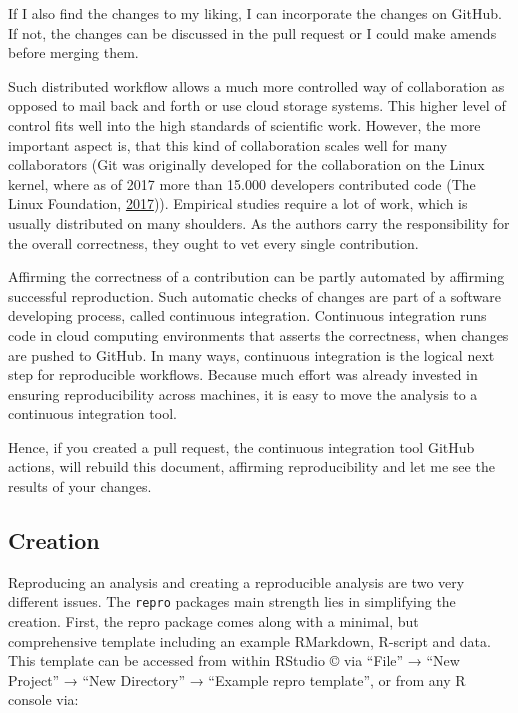 \documentclass[12pt,a4paper,]{article}
\begin{document}
If I also find the changes to my liking, I can incorporate the changes on GitHub.
If not, the changes can be discussed in the pull request or I could make amends before merging them.

Such distributed workflow allows a much more controlled way of collaboration as opposed to mail back and forth or use cloud storage systems.
This higher level of control fits well into the high standards of scientific work.
However, the more important aspect is, that this kind of collaboration scales well for many collaborators (Git was originally developed for the collaboration on the Linux kernel, where as of 2017 more than 15.000 developers contributed code (The Linux Foundation, \protect\hyperlink{ref-thelinuxfoundation2017LinuxKernel2017}{2017})).
Empirical studies require a lot of work, which is usually distributed on many shoulders.
As the authors carry the responsibility for the overall correctness, they ought to vet every single contribution.

Affirming the correctness of a contribution can be partly automated by affirming successful reproduction.
Such automatic checks of changes are part of a software developing process, called continuous integration.
Continuous integration runs code in cloud computing environments that asserts the correctness, when changes are pushed to GitHub.
In many ways, continuous integration is the logical next step for reproducible workflows.
Because much effort was already invested in ensuring reproducibility across machines, it is easy to move the analysis to a continuous integration tool.

Hence, if you created a pull request, the continuous integration tool GitHub actions, will rebuild this document, affirming reproducibility and let me see the results of your changes.

\hypertarget{creation}{%
\subsection{Creation}\label{creation}}

Reproducing an analysis and creating a reproducible analysis are two very different issues.
The \texttt{repro} packages main strength lies in simplifying the creation.
First, the repro package comes along with a minimal, but comprehensive template including an example RMarkdown, R-script and data.
This template can be accessed from within RStudio © via ``File'' → ``New Project'' → ``New Directory'' → ``Example repro template'', or from any R console via:
\end{document}
